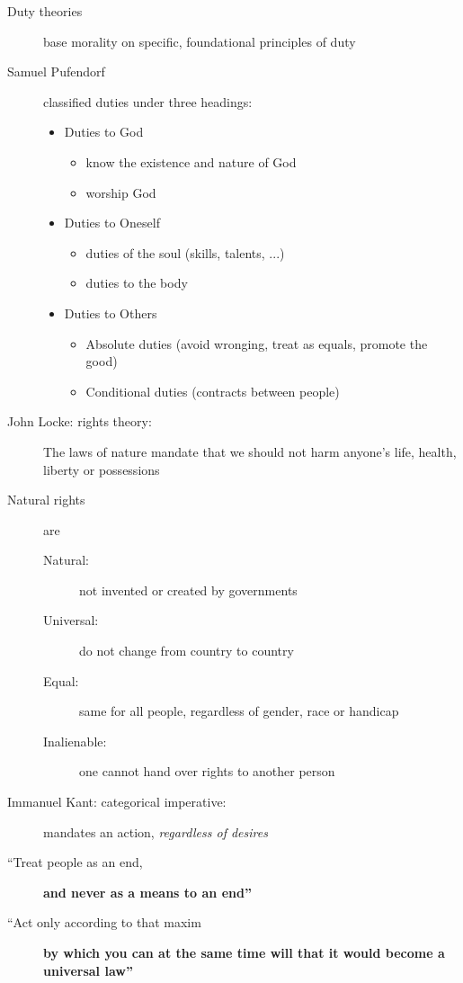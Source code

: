 \documentclass[a4paper]{article}
\begin{document}
\begin{description}
\item[Duty theories] base morality on specific, foundational principles of duty
\item[Samuel Pufendorf] classified duties under three headings:
\begin{itemize}
\item Duties to God
\begin{itemize}
\item know the existence and nature of God
\item worship God
\end{itemize}
\item Duties to Oneself
\begin{itemize}
\item duties of the soul (skills, talents, ...)
\item duties to the body
\end{itemize}
\item Duties to Others
\begin{itemize}
\item Absolute duties (avoid wronging, treat as equals, promote the good)
\item Conditional duties (contracts between people)
\end{itemize}
\end{itemize}
\item[John Locke: rights theory:] The laws of nature mandate that we should not harm anyone's life, health, liberty or possessions
\item[Natural rights] are
\begin{description}
\item[Natural:] not invented or created by governments
\item[Universal:] do not change from country to country
\item[Equal:] same for all people, regardless of gender, race or handicap
\item[Inalienable:] one cannot hand over rights to another person
\end{description}
\item[Immanuel Kant: categorical imperative:] mandates an action, \textit{regardless of desires}
\item[``Treat people as an end,] \textbf{and never as a means to an end''}
\item[``Act only according to that maxim] \textbf{by which you can at the same time will that it would become a universal law''}
\end{description}
\end{document}
